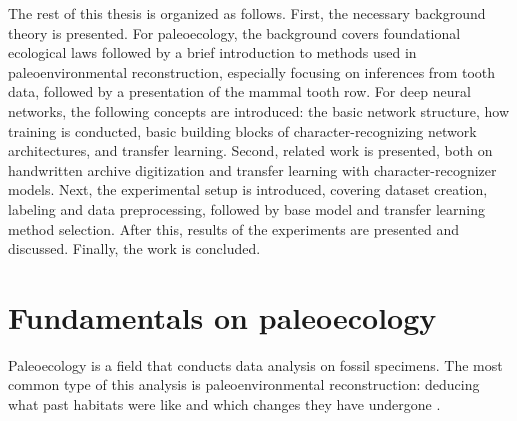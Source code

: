 \documentclass{article}
\begin{document}
The rest of this thesis is organized as follows. First, the necessary background theory is 
presented. For paleoecology, the background covers 
foundational ecological laws followed by a brief introduction to methods used in
paleoenvironmental reconstruction, especially focusing on inferences from tooth data,
followed by a presentation of the mammal tooth row.
For deep neural networks, the following concepts are introduced:
the basic network structure, how training is conducted, basic building blocks of character-recognizing network architectures, and transfer learning. 
Second, related work is presented, both on
handwritten archive digitization and transfer learning with character-recognizer models.
Next, the experimental setup is introduced, covering dataset creation, labeling and data 
preprocessing, followed by base model and transfer learning method selection. After this, 
results of the experiments are presented and discussed. Finally, the work is concluded.

\section{Fundamentals on paleoecology}

Paleoecology is a field that conducts data analysis on fossil specimens. The most common type of 
this analysis is paleoenvironmental reconstruction: deducing what past habitats were like and which 
changes they have undergone \cite{Faith_Lyman_2019}.
\end{document}
